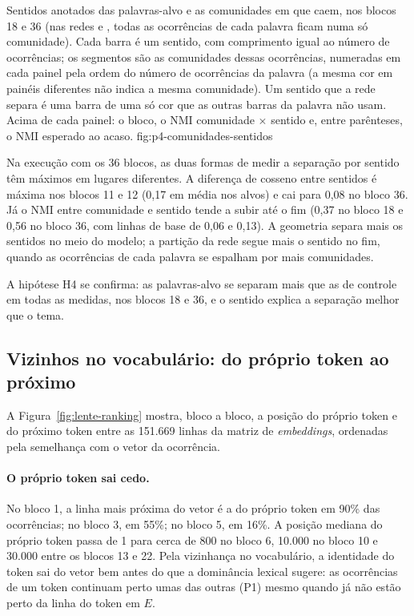     {Sentidos anotados das palavras-alvo e as comunidades em que caem, nos blocos 18 e 36 (nas
    redes  e , todas as ocorrências de cada palavra ficam numa só comunidade).
    Cada barra é um sentido, com comprimento igual ao número de ocorrências; os segmentos são
    as comunidades dessas ocorrências, numeradas em cada painel pela ordem do número de
    ocorrências da palavra (a mesma cor em painéis diferentes não indica a mesma comunidade).
    Um sentido que a rede separa é uma barra de uma só cor que as outras barras da palavra não
    usam. Acima de cada painel: o bloco, o NMI comunidade $\times$ sentido e, entre
    parênteses, o NMI esperado ao acaso.}
    {fig:p4-comunidades-sentidos}

Na execução com os 36 blocos, as duas formas de medir a separação por sentido têm máximos em
lugares diferentes. A diferença de cosseno entre sentidos é máxima nos blocos 11 e 12 (0,17 em
média nos alvos) e cai para 0,08 no bloco 36. Já o NMI entre comunidade e sentido tende a subir
até o fim (0,37 no bloco 18 e 0,56 no bloco 36, com linhas de base de 0,06 e 0,13). A
geometria separa mais os sentidos no meio do modelo; a partição da rede segue mais o sentido no
fim, quando as ocorrências de cada palavra se espalham por mais comunidades.

A hipótese H4 se confirma: as palavras-alvo se separam mais que as de controle em todas as
medidas, nos blocos 18 e 36, e o sentido explica a separação melhor que o tema.

\subsection{Vizinhos no vocabulário: do próprio token ao próximo}\label{sec:res-lente}

A Figura~\ref{fig:lente-ranking} mostra, bloco a bloco, a posição do próprio token e do próximo
token entre as 151.669 linhas da matriz de \emph{embeddings}, ordenadas pela semelhança com o
vetor da ocorrência.

\paragraph{O próprio token sai cedo.} No bloco 1, a linha mais próxima do vetor é a do próprio
token em 90\% das ocorrências; no bloco 3, em 55\%; no bloco 5, em 16\%. A posição mediana do
próprio token passa de 1 para cerca de 800 no bloco 6, 10.000 no bloco 10 e 30.000 entre os
blocos 13 e 22. Pela vizinhança no vocabulário, a identidade do token sai do vetor bem antes do
que a dominância lexical sugere: as ocorrências de um token continuam perto umas das outras
(P1) mesmo quando já não estão perto da linha do token em $E$.

